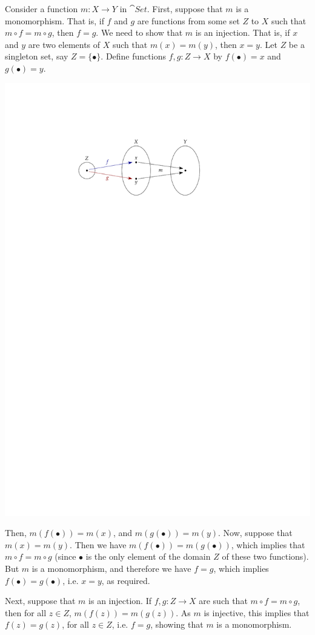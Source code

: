 \begin{Solution*}
Consider a function $m \colon X \to Y$ in $\cat{Set}$. First, suppose that $m$ is a monomorphism. That is, if $f$ and $g$ are functions from some set $Z$ to $X$ such that $m \circ f = m \circ g$, then $f = g$. We need to show that $m$ is an injection. That is, if $x$ and $y$ are two elements of $X$ such that $m(x) = m(y)$, then $x = y$. Let $Z$ be a singleton set, say $Z = \{\bullet\}$. Define functions $f, g \colon Z \to X$ by $f(\bullet) = x$ and $g(\bullet) = y$.
\begin{center}
\includegraphics[scale=1.2]{Mono=Injection.pdf}
\end{center}
Then, $m(f(\bullet)) = m(x)$, and $m(g(\bullet)) = m(y)$. Now, suppose that $m(x) = m(y)$. Then we have $m(f(\bullet)) = m(g(\bullet))$, which implies that $m \circ f = m \circ g$ (since $\bullet$ is the only element of the domain $Z$ of these two functions). But $m$ is a monomorphism, and therefore we have $f = g$, which implies $f(\bullet) = g(\bullet)$, i.e. $x = y$, as required.

Next, suppose that $m$ is an injection. If $f, g \colon Z \to X$ are such that $m \circ f = m \circ g$, then for all $z \in Z$, $m(f(z)) = m(g(z))$. As $m$ is injective, this implies that $f(z) = g(z)$, for all $z \in Z$, i.e. $f = g$, showing that $m$ is a monomorphism.
\end{Solution*}

